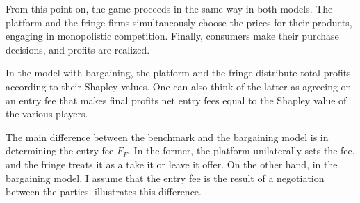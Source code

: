 \documentclass[a4paper]{article}
\begin{document}
From this point on, the game proceeds in the same way in both models.
The platform and the fringe firms simultaneously choose the prices for their products, engaging in monopolistic competition.
Finally, consumers make their purchase decisions, and profits are realized.

In the model with bargaining, the platform and the fringe distribute total profits according to their Shapley values.
One can also think of the latter as agreeing on an entry fee that makes final profits net entry fees equal to the Shapley value of the various players.

The main difference between the benchmark and the bargaining model is in determining the entry fee $F_F$.
In the former, the platform unilaterally sets the fee, and the fringe treats it as a take it or leave it offer.
On the other hand, in the bargaining model, I assume that the entry fee is the result of a negotiation between the parties.
 illustrates this difference.
\end{document}
